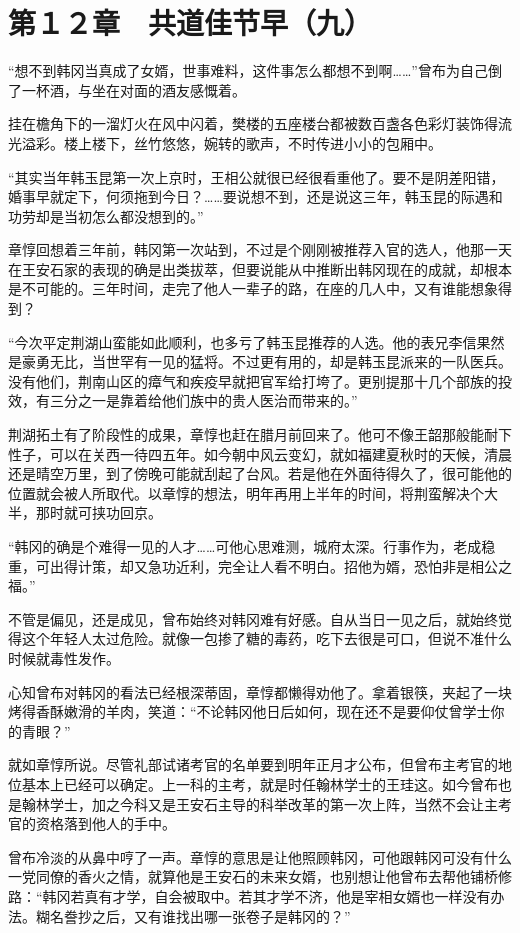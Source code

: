 \section{第１２章　共道佳节早（九）}

“想不到韩冈当真成了女婿，世事难料，这件事怎么都想不到啊……”曾布为自己倒了一杯酒，与坐在对面的酒友感慨着。

挂在檐角下的一溜灯火在风中闪着，樊楼的五座楼台都被数百盏各色彩灯装饰得流光溢彩。楼上楼下，丝竹悠悠，婉转的歌声，不时传进小小的包厢中。

“其实当年韩玉昆第一次上京时，王相公就很已经很看重他了。要不是阴差阳错，婚事早就定下，何须拖到今日？……要说想不到，还是说这三年，韩玉昆的际遇和功劳却是当初怎么都没想到的。”

章惇回想着三年前，韩冈第一次站到，不过是个刚刚被推荐入官的选人，他那一天在王安石家的表现的确是出类拔萃，但要说能从中推断出韩冈现在的成就，却根本是不可能的。三年时间，走完了他人一辈子的路，在座的几人中，又有谁能想象得到？

“今次平定荆湖山蛮能如此顺利，也多亏了韩玉昆推荐的人选。他的表兄李信果然是豪勇无比，当世罕有一见的猛将。不过更有用的，却是韩玉昆派来的一队医兵。没有他们，荆南山区的瘴气和疾疫早就把官军给打垮了。更别提那十几个部族的投效，有三分之一是靠着给他们族中的贵人医治而带来的。”

荆湖拓土有了阶段性的成果，章惇也赶在腊月前回来了。他可不像王韶那般能耐下性子，可以在关西一待四五年。如今朝中风云变幻，就如福建夏秋时的天候，清晨还是晴空万里，到了傍晚可能就刮起了台风。若是他在外面待得久了，很可能他的位置就会被人所取代。以章惇的想法，明年再用上半年的时间，将荆蛮解决个大半，那时就可挟功回京。

“韩冈的确是个难得一见的人才……可他心思难测，城府太深。行事作为，老成稳重，可出得计策，却又急功近利，完全让人看不明白。招他为婿，恐怕非是相公之福。”

不管是偏见，还是成见，曾布始终对韩冈难有好感。自从当日一见之后，就始终觉得这个年轻人太过危险。就像一包掺了糖的毒药，吃下去很是可口，但说不准什么时候就毒性发作。

心知曾布对韩冈的看法已经根深蒂固，章惇都懒得劝他了。拿着银筷，夹起了一块烤得香酥嫩滑的羊肉，笑道：“不论韩冈他日后如何，现在还不是要仰仗曾学士你的青眼？”

就如章惇所说。尽管礼部试诸考官的名单要到明年正月才公布，但曾布主考官的地位基本上已经可以确定。上一科的主考，就是时任翰林学士的王珪这。如今曾布也是翰林学士，加之今科又是王安石主导的科举改革的第一次上阵，当然不会让主考官的资格落到他人的手中。

曾布冷淡的从鼻中哼了一声。章惇的意思是让他照顾韩冈，可他跟韩冈可没有什么一党同僚的香火之情，就算他是王安石的未来女婿，也别想让他曾布去帮他铺桥修路：“韩冈若真有才学，自会被取中。若其才学不济，他是宰相女婿也一样没有办法。糊名誊抄之后，又有谁找出哪一张卷子是韩冈的？”


